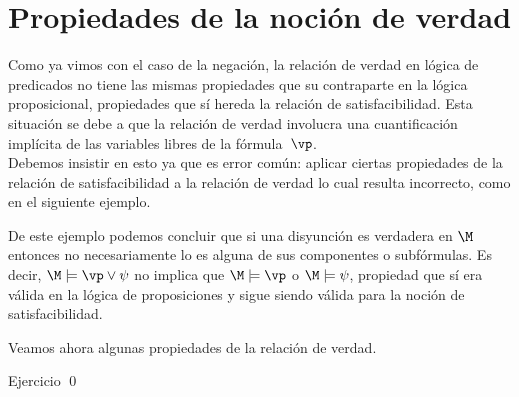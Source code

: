 \documentclass[11pt,letterpaper]{article}
\begin{document}
\section{Propiedades de la noción de verdad}

Como ya vimos con el caso de la negación, la relaci\'on de verdad en lógica de 
predicados no tiene las mismas propiedades que su contraparte en la lógica 
proposicional, propiedades que sí hereda la relación de satisfacibilidad. Esta 
situación se debe a que la relaci\'on de verdad involucra una cuantificaci\'on 
impl\'icita de las variables libres de la f\'ormula~$\vp$. \\
Debemos insistir en esto ya que es error com\'un: aplicar ciertas propiedades 
de la relaci\'on de satisfacibilidad a la relación de verdad lo cual resulta 
incorrecto, como en el siguiente ejemplo.


De este ejemplo podemos concluir que si una disyunción es verdadera en $\M$ 
entonces no necesariamente lo es alguna de sus componentes o subf\'ormulas.
Es decir, $\M\models \vp\lor\psi$ no implica que $\M\models\vp$ o 
$\M\models\psi$, propiedad que sí era válida en la lógica de proposiciones y 
sigue siendo válida para la noción de satisfacibilidad.\\


\newpage

Veamos ahora algunas propiedades de la relaci\'on de verdad.

\proof Ejercicio \qed
\end{document}
